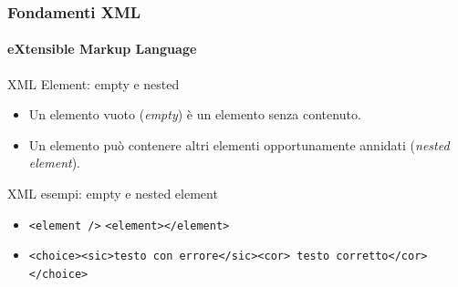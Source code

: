 

\begin{frame}
    \frametitle{Fondamenti XML}
    \framesubtitle{eXtensible Markup Language}
    \addtocounter{nframe}{1}

	\begin{block}{XML Element: empty e nested}
		\begin{itemize}
			\item Un elemento vuoto (\textit{empty}) è un elemento senza contenuto.
			\item Un elemento può contenere altri elementi opportunamente annidati (\textit{nested element}).
		\end{itemize}
	\end{block}

	\begin{block}{XML esempi: empty e nested element}
		\begin{itemize}
			\item \texttt{<element />} \texttt{<element></element>}
			\item \texttt{<choice><sic>testo con errore</sic><cor> testo corretto</cor></choice>}
		\end{itemize}
		
	\end{block}
	
\end{frame}



